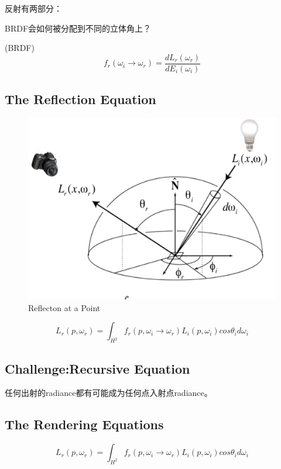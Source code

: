 反射有两部分：

BRDF会如何被分配到不同的立体角上？

\begin{define}
    (BRDF)
    \begin{equation}
        f_r(\omega_i\rightarrow \omega_r)=\frac{dL_r(\omega_r)}{dE_i(\omega_i)}
    \end{equation}

\end{define}

\subsection*{The Reflection Equation}
\begin{figure}[H]
    \centering
    \includegraphics[scale=0.5]{figures/反射方程.png}
    \caption{Reflecton at a Point}
\end{figure}

\begin{equation}
    L_r(p,\omega_r)=\int_{H^2}f_r(p,\omega_i\rightarrow \omega_r)L_i(p,\omega_i)cos\theta_id\omega_i
\end{equation}

\subsection*{Challenge:Recursive Equation}

任何出射的radiance都有可能成为任何点入射点radiance。

\subsection*{The Rendering Equations}
\begin{equation}
    L_r(p,\omega_r)=\int_{H^2}f_r(p,\omega_i\rightarrow \omega_r)L_i(p,\omega_i)cos\theta_id\omega_i
\end{equation}

